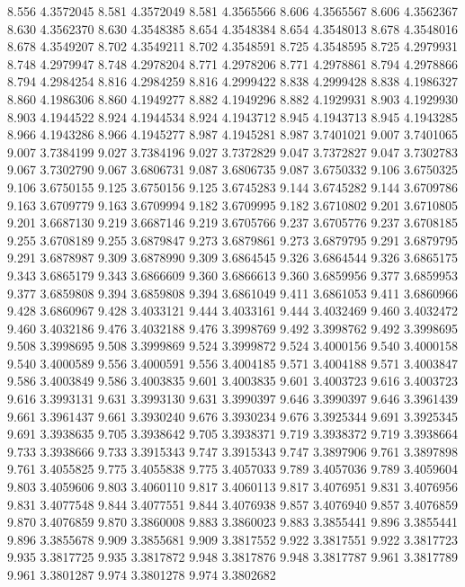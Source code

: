 8.556 4.3572045
8.581 4.3572049
8.581 4.3565566
8.606 4.3565567
8.606 4.3562367
8.630 4.3562370
8.630 4.3548385
8.654 4.3548384
8.654 4.3548013
8.678 4.3548016
8.678 4.3549207
8.702 4.3549211
8.702 4.3548591
8.725 4.3548595
8.725 4.2979931
8.748 4.2979947
8.748 4.2978204
8.771 4.2978206
8.771 4.2978861
8.794 4.2978866
8.794 4.2984254
8.816 4.2984259
8.816 4.2999422
8.838 4.2999428
8.838 4.1986327
8.860 4.1986306
8.860 4.1949277
8.882 4.1949296
8.882 4.1929931
8.903 4.1929930
8.903 4.1944522
8.924 4.1944534
8.924 4.1943712
8.945 4.1943713
8.945 4.1943285
8.966 4.1943286
8.966 4.1945277
8.987 4.1945281
8.987 3.7401021
9.007 3.7401065
9.007 3.7384199
9.027 3.7384196
9.027 3.7372829
9.047 3.7372827
9.047 3.7302783
9.067 3.7302790
9.067 3.6806731
9.087 3.6806735
9.087 3.6750332
9.106 3.6750325
9.106 3.6750155
9.125 3.6750156
9.125 3.6745283
9.144 3.6745282
9.144 3.6709786
9.163 3.6709779
9.163 3.6709994
9.182 3.6709995
9.182 3.6710802
9.201 3.6710805
9.201 3.6687130
9.219 3.6687146
9.219 3.6705766
9.237 3.6705776
9.237 3.6708185
9.255 3.6708189
9.255 3.6879847
9.273 3.6879861
9.273 3.6879795
9.291 3.6879795
9.291 3.6878987
9.309 3.6878990
9.309 3.6864545
9.326 3.6864544
9.326 3.6865175
9.343 3.6865179
9.343 3.6866609
9.360 3.6866613
9.360 3.6859956
9.377 3.6859953
9.377 3.6859808
9.394 3.6859808
9.394 3.6861049
9.411 3.6861053
9.411 3.6860966
9.428 3.6860967
9.428 3.4033121
9.444 3.4033161
9.444 3.4032469
9.460 3.4032472
9.460 3.4032186
9.476 3.4032188
9.476 3.3998769
9.492 3.3998762
9.492 3.3998695
9.508 3.3998695
9.508 3.3999869
9.524 3.3999872
9.524 3.4000156
9.540 3.4000158
9.540 3.4000589
9.556 3.4000591
9.556 3.4004185
9.571 3.4004188
9.571 3.4003847
9.586 3.4003849
9.586 3.4003835
9.601 3.4003835
9.601 3.4003723
9.616 3.4003723
9.616 3.3993131
9.631 3.3993130
9.631 3.3990397
9.646 3.3990397
9.646 3.3961439
9.661 3.3961437
9.661 3.3930240
9.676 3.3930234
9.676 3.3925344
9.691 3.3925345
9.691 3.3938635
9.705 3.3938642
9.705 3.3938371
9.719 3.3938372
9.719 3.3938664
9.733 3.3938666
9.733 3.3915343
9.747 3.3915343
9.747 3.3897906
9.761 3.3897898
9.761 3.4055825
9.775 3.4055838
9.775 3.4057033
9.789 3.4057036
9.789 3.4059604
9.803 3.4059606
9.803 3.4060110
9.817 3.4060113
9.817 3.4076951
9.831 3.4076956
9.831 3.4077548
9.844 3.4077551
9.844 3.4076938
9.857 3.4076940
9.857 3.4076859
9.870 3.4076859
9.870 3.3860008
9.883 3.3860023
9.883 3.3855441
9.896 3.3855441
9.896 3.3855678
9.909 3.3855681
9.909 3.3817552
9.922 3.3817551
9.922 3.3817723
9.935 3.3817725
9.935 3.3817872
9.948 3.3817876
9.948 3.3817787
9.961 3.3817789
9.961 3.3801287
9.974 3.3801278
9.974 3.3802682
